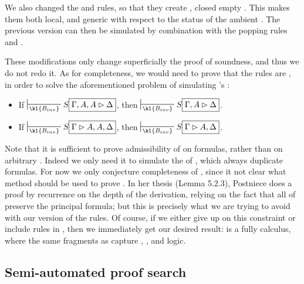 \begin{remark}
  We also changed the \kl{\bot{-}} and \kl{\top{+}} rules, so that they create
  , closed empty . This makes them both local, and generic
  with respect to the status of the ambient . The previous version can
  then be simulated by combination with the popping rules  and
  .
\end{remark}

These modifications only change superficially the proof of soundness, and thus
we do not redo it. As for completeness, we would need to prove that the
 rules are , in order to solve the aforementioned problem
of simulating 's :

\begin{lemma}
  \sbr
  \begin{itemize}
    \item If $\prov{\kl{B_{inv}}} S\select{\Gamma, A, A \J \Delta}$, then
          $\prov{\kl{B_{inv}}} S\select{\Gamma, A \J \Delta}$.
    \item If $\prov{\kl{B_{inv}}} S\select{\Gamma \J A, A, \Delta}$, then
          $\prov{\kl{B_{inv}}} S\select{\Gamma \J A, \Delta}$.
  \end{itemize}
\end{lemma}

Note that it is sufficient to prove admissibility of  on
formulas, rather than on arbitrary . Indeed we only need it to simulate the
 of , which always duplicate formulas. For now
we only conjecture completeness of , since it not clear what method
should be used to prove . In her thesis
\cite{postniece_proof_2010} (Lemma 5.2.3), Postniece does a proof by recurrence
on the depth of the derivation, relying on the fact that all  of  preserve the principal formula; but this is precisely what
we are trying to avoid with our version of the rules. Of course, if we either
give up on this constraint or include  rules in , then we
immediately get our desired result:  is a fully  calculus,
where the same fragments as  capture ,
,  and  logic.

\subsection{Semi-automated proof search}

